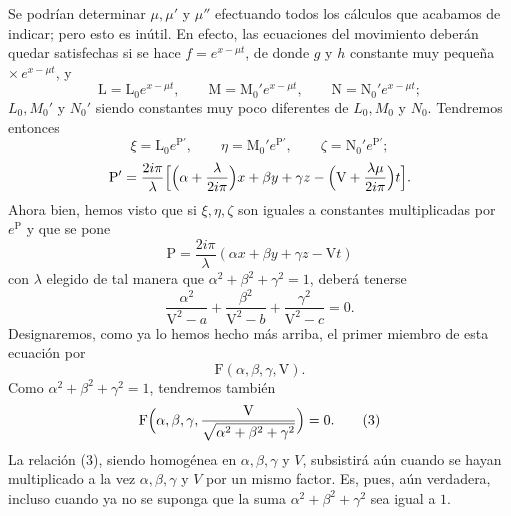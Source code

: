 Se podrían determinar $\mu,\mu'$ y $\mu''$ efectuando todos los cálculos
que acabamos de indicar; pero esto es inútil. En efecto, las ecuaciones
del movimiento deberán quedar satisfechas si se hace $f=e^{x-\mu t}$, de
donde $g$ y $h$ constante muy pequeña $\times\,e^{x-\mu t}$, y
\[
\mathrm L=\mathrm L_0e^{x-\mu t},\qquad \mathrm M=\mathrm M_0'e^{x-\mu t},\qquad \mathrm N=\mathrm N_0'e^{x-\mu t};
\]
$L_0,M_0'$ y $N_0'$ siendo constantes muy poco diferentes de $L_0,M_0$ y
$N_0$. Tendremos entonces
\[
\xi=\mathrm L_0e^{\mathrm P'},\qquad \eta=\mathrm M_0'e^{\mathrm P'},\qquad \zeta=\mathrm N_0'e^{\mathrm P'};
\]
\[
\mathrm P'=\frac{2i\pi}{\lambda}\Bigl[\Bigl(\alpha+\frac{\lambda}{2i\pi}\Bigr)x+\beta y+\gamma z-\Bigl(\mathrm V+\frac{\lambda\mu}{2i\pi}\Bigr)t\Bigr].
\]
Ahora bien, hemos visto que si $\xi,\eta,\zeta$ son iguales a constantes
multiplicadas por $e^{\mathrm P}$ y que se pone
\[
\mathrm P=\frac{2i\pi}{\lambda}(\alpha x+\beta y+\gamma z-\mathrm Vt)
\]
con $\lambda$ elegido de tal manera que $\alpha^2+\beta^2+\gamma^2=1$,
deberá tenerse
\[
\frac{\alpha^2}{\mathrm V^2-a}+\frac{\beta^2}{\mathrm V^2-b}+\frac{\gamma^2}{\mathrm V^2-c}=0.
\]
Designaremos, como ya lo hemos hecho más arriba, el primer miembro de
esta ecuación por
\[
\mathrm F(\alpha,\beta,\gamma,\mathrm V).
\]
Como $\alpha^2+\beta^2+\gamma^2=1$, tendremos también
\begin{equation}
\mathrm F\Bigl(\alpha,\beta,\gamma,\frac{\mathrm V}{\sqrt{\alpha^2+\beta^2+\gamma^2}}\Bigr)=0.
\tag{3}
\end{equation}
La relación (3), siendo homogénea en $\alpha,\beta,\gamma$ y $V$,
subsistirá aún cuando se hayan multiplicado a la vez $\alpha,\beta,\gamma$
y $V$ por un mismo factor. Es, pues, aún verdadera, incluso cuando ya no
se suponga que la suma $\alpha^2+\beta^2+\gamma^2$ sea igual a $1$.


